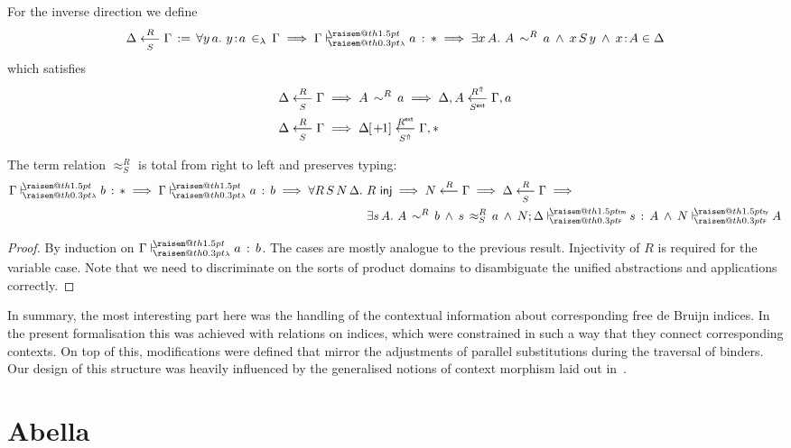 \documentclass[a4paper,UKenglish]{lipics-v2016}
\makeatletter
\newcommand{\ms}{\,}
\newcommand{\mrel}[1]{\mathrel{\ms #1 \ms}}
\newcommand{\OF}{\mrel{:}}
\newcommand{\mAnd}{\mrel{\wedge}}
\newcommand{\mAll}[1]{\ensuremath{\forall} #1.\ms\ms}
\newcommand{\mEx}[1]{\ensuremath{\exists} #1.\ms\ms}
\newcommand{\eqdef}{\mrel{:=}}
\newcommand{\ty}{\mathsf{ty}}
\newcommand{\tm}{\mathsf{tm}}
\newcommand{\of}{\ensuremath{\!:\!}}
\newcommand{\cc}[2]{#1;#2} %
\newcommand{\raisemath}[1]{\mathpalette{\raisem@th{#1}}}
\newcommand{\raisem@th}[3]{\raisebox{#1}{\ensuremath{#2#3}}}
\newcommand{\tsAnnot}[2]{\vdash\hspace{-.7em}^{\raisemath{1.5pt}{\scriptscriptstyle{#2}}}_{\raisemath{0.3pt}{\scriptscriptstyle{#1}}}} %
\newcommand{\tfF}{\tsAnnot{\mathsf{F}}{\ty}}  %
\newcommand{\tyF}{\tsAnnot{\mathsf{F}}{\tm}}  %
\newcommand{\istyF}[2]{\ensuremath{{#1} \mathrel{\tfF} #2}}
\newcommand{\typingF}[3]{\ensuremath{{#1} \mathrel{\tyF} #2 \OF #3}}
\newcommand{\tyL}{\tsAnnot{\lambda}{}} %
\newcommand{\typingL}[3]{\ensuremath{{#1} \mathrel{\tyL} #2 \OF #3}}
\newcommand{\inL}{\mrel{\in_{\lambda}}}
\newcommand{\tyr}{\mathrel{\sim}}
\newcommand{\tmr}{\mathrel{\approx}}
\newcommand{\Rext}[1]{\ensuremath{#1^{\mathsf{ext}}}}
\newcommand{\Rshift}[1]{\ensuremath{#1^{\Uparrow}}}
\newcommand{\tyctxrelLF}[3]{\ensuremath{#1\mathrel{\mathop{\longleftarrow}^{#2}\limits}#3}}
\newcommand{\tmctxrelLF}[4]{\ensuremath{#1\mathrel{\mathop{\longleftarrow}^{#2}_{#3}\limits}#4}}
\newcommand{\Prp}{\ensuremath{\textrm{\textasteriskcentered}}}
\newcommand{\subst}[1]{\hphantom{|}\!\![{#1}]}
\newcommand{\shift}{\ensuremath{\hspace{0.1em}\mathsf{+}\hspace{0.08em}\!1}}
\makeatother
\begin{document}
For the inverse direction we define
\begin{align*}
  \tmctxrelLF{\Delta}{R}{S}{\Gamma} \eqdef \mAll{y\,a} y \of a \inL \Gamma \implies \typingL{\Gamma}{a}{\Prp} \implies \mEx{x\,A} A\,\tyr^R\,a \mAnd x\,S\,y \mAnd x \of A \in \Delta
\end{align*}
which satisfies
\begin{align*}
  &\tmctxrelLF{\Delta}{R}{S}{\Gamma} \implies A\,\tyr^R\,a \implies \tmctxrelLF{\Delta,A}{\Rshift{R}}{\Rext{S}}{\Gamma,a}\\
  &\tmctxrelLF{\Delta}{R}{S}{\Gamma} \implies \tmctxrelLF{\Delta\subst{\shift}}{\Rext{R}}{\Rshift{S}}{\Gamma,\Prp}
\end{align*}
\begin{lemma}
  The term relation $\tmr^R_S$ is total from right to left and preserves typing:
  \begin{align*}
    \typingL{\Gamma}{b}{\Prp} \implies \typingL{\Gamma}{a}{b} \implies \mAll{R\,S\,N\,\Delta} &R\ms\ms\mathsf{inj} \implies \tyctxrelLF{N}{R}{\Gamma} \implies \tmctxrelLF{\Delta}{R}{S}{\Gamma} \implies \\
                                                                &\mEx{s\,A} A\,\tyr^R\,b \mAnd s\,\tmr^R_S\,a \mAnd \typingF{\cc{N}{\Delta}}{s}{A} \mAnd \istyF{N}{A}
  \end{align*}
\end{lemma}
\begin{proof}
  By induction on $\typingL{\Gamma}{a}{b}$.
  The cases are mostly analogue to the previous result.
  Injectivity of $R$ is required for the variable case.
  Note that we need to discriminate on the sorts of product domains to disambiguate the unified abstractions and applications correctly.
\end{proof}

In summary, the most interesting part here was the handling of the contextual information about corresponding free de Bruijn indices.
In the present formalisation this was achieved with relations on indices, which were constrained in such a way that they connect corresponding contexts.
On top of this, modifications were defined that mirror the adjustments of parallel substitutions during the traversal of binders.
Our design of this structure was heavily influenced by the generalised notions of context morphism laid out in~\cite{KaiserEtAl:2017:sysf_pts_equiv_coq}.

\section{Abella}
\label{sec:abella}
\end{document}
